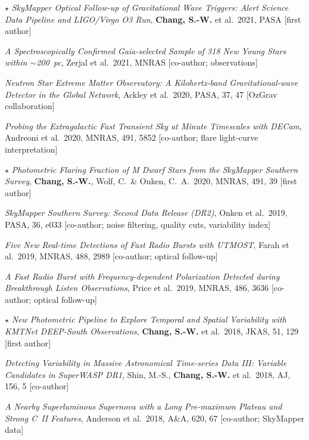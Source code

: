 \documentclass[letterpaper,11pt]{article}
\begin{document}
{\begin{etaremune}
\item $\star$ \emph{SkyMapper Optical Follow-up of Gravitational Wave Triggers: Alert
Science Data Pipeline and LIGO/Virgo O3 Run}, \textbf{Chang, S.-W.} et al.\ 2021, PASA
[first author]

\item \emph{A Spectroscopically Confirmed Gaia-selected Sample of 318 New Young Stars
within $\sim$200~pc}, Zerjal et al.\ 2021, MNRAS [co-author; observations]

\item \emph{Neutron Star Extreme Matter Observatory: A Kilohertz-band Gravitational-wave
Detector in the Global Network}, Ackley et al.\ 2020, PASA, 37, 47
[OzGrav collaboration]

\item \emph{Probing the Extragalactic Fast Transient Sky at Minute Timescales with DECam},
Andreoni et al.\ 2020, MNRAS, 491, 5852 [co-author; flare light-curve interpretation]

\item $\star$ \emph{Photometric Flaring Fraction of M Dwarf Stars from the SkyMapper
Southern Survey}, \textbf{Chang, S.-W.}, Wolf, C.\ \& Onken, C.~A.\ 2020, MNRAS, 491, 39
[first author]

\item \emph{SkyMapper Southern Survey: Second Data Release (DR2)}, Onken et al.\ 2019,
PASA, 36, e033 [co-author; noise filtering, quality cuts, variability index]

\item \emph{Five New Real-time Detections of Fast Radio Bursts with UTMOST},
Farah et al.\ 2019, MNRAS, 488, 2989 [co-author; optical follow-up]

\item \emph{A Fast Radio Burst with Frequency-dependent Polarization Detected during
Breakthrough Listen Observations}, Price et al.\ 2019, MNRAS, 486, 3636
[co-author; optical follow-up]

\item $\star$ \emph{New Photometric Pipeline to Explore Temporal and Spatial Variability
with KMTNet DEEP-South Observations}, \textbf{Chang, S.-W.} et al.\ 2018, JKAS, 51, 129
[first author]

\item \emph{Detecting Variability in Massive Astronomical Time-series Data III: Variable
Candidates in SuperWASP DR1}, Shin, M.-S., \textbf{Chang, S.-W.} et al.\ 2018, AJ, 156, 5
[co-author]

\item \emph{A Nearby Superluminous Supernova with a Long Pre-maximum Plateau and Strong
C~II Features}, Anderson et al.\ 2018, A\&A, 620, 67 [co-author; SkyMapper data]


\end{etaremune}}
\end{document}
